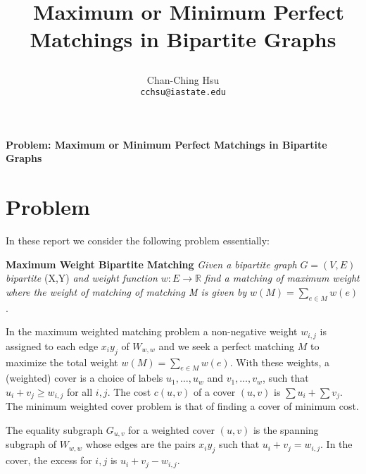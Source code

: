 \documentclass[11pt]{article}
\begin{document}
\thispagestyle{empty}
\title{\begin{center}
\textbf{\
\Large Maximum or Minimum Perfect Matchings in Bipartite Graphs
}
\end{center}}
\author{
Chan-Ching Hsu\\
\texttt{cchsu@iastate.edu}
}
\maketitle
\vspace{1em}
\textbf{\large Problem: Maximum or Minimum Perfect Matchings in Bipartite Graphs}


\section{Problem}
In these report we consider the following problem essentially:

\textbf{Maximum Weight Bipartite Matching} \emph{Given a bipartite graph} $G=(V,E)$ \emph{bipartite} (X,Y) \emph{and weight function} $w:E\rightarrow\mathbb{R}$ \emph{find a matching of maximum weight where the weight of matching of matching M is given by} $w(M)=\sum_{e\in M}{w(e)}$.%

In the maximum weighted matching problem a non-negative weight $w_{i,j}$ is assigned to each edge $x_iy_j$ of $W_{w,w}$ and we seek a perfect matching $M$ to maximize the total weight $w(M)=\sum_{e\in M}{w(e)}$. With these weights, a (weighted) cover is a choice of labels $u_1,\ldots,u_w$ and $v_1,\ldots,v_w$, such that $u_i+v_j\geq w_{i,j}$ for all $i,j$. The cost $c(u,v)$ of a cover $(u,v)$ is $\sum{u_i}+\sum{v_j}$. The minimum weighted cover problem is that of finding a cover of minimum cost.

The equality subgraph $G_{u,v}$ for a weighted cover $(u,v)$ is the spanning subgraph of $W_{w,w}$ whose edges are the pairs $x_iy_j$ such that $u_i+v_j=w_{i,j}$. In the cover, the excess for $i,j$ is $u_i+v_j-w_{i,j}$.
\end{document}
